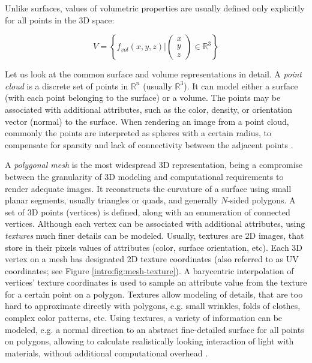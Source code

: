 Unlike surfaces, values of volumetric properties are usually defined only explicitly for all points in the 3D space:

\begin{equation}
	\renewcommand\arraystretch{0.6}
	V = \left\{ f_{vol}(x,y,z)  \Bigg\rvert \begin{pmatrix} x \\ y \\ z \end{pmatrix} \in \mathbb{R}^3 \right\}
\end{equation}
  

Let us look at the common surface and volume representations in detail. A \textit{point cloud} is a discrete set of points in $\mathbb{R}^n$ (usually $\mathbb{R}^3$). It can model either a surface (with each point belonging to the surface) or a volume. The points may be associated with additional attributes, such as the color, density, or orientation vector (normal) to the surface. When rendering an image from a point cloud, commonly the points are interpreted as spheres with a certain radius, to compensate for sparsity and lack of connectivity between the adjacent points \cite{aux:pointcloud21}.

A \textit{polygonal mesh} is the most widespread 3D representation, being a compromise between the granularity of 3D modeling and computational requirements to render adequate images. It reconstructs the curvature of a surface using small planar segments, usually triangles or quads, and generally $N$-sided polygons. A set of 3D points (vertices) is defined, along with an enumeration of connected vertices. Although each vertex can be associated with additional attributes, using \textit{textures} much finer details can be modeled. Usually, textures are 2D images, that store in their pixels values of attributes (color, surface orientation, etc). Each 3D vertex on a mesh has designated 2D texture coordinates (also referred to as UV coordinates; see Figure \ref{intro:fig:mesh-texture}). A barycentric interpolation of vertices' texture coordinates is used to sample an attribute value from the texture for a certain point on a polygon. Textures allow modeling of details, that are too hard to approximate directly with polygons, e.g. small wrinkles, folds of clothes, complex color patterns, etc. Using textures, a variety of information can be modeled, e.g. a normal direction to an abstract fine-detailed surface for all points on polygons, allowing to calculate realistically looking interaction of light with materials, without additional computational overhead \cite{aux:normal-mapping78}. 

